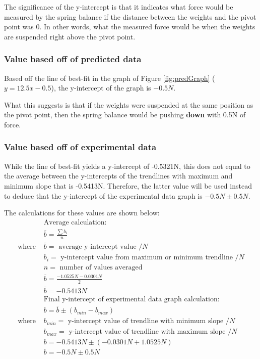 \documentclass[letterpaper, 12pt]{article}
\begin{document}
The significance of the y-intercept is that it indicates what force would
be measured by the spring balance if the distance between the weights and
the pivot point was 0. In other words, what the measured force would be when
the weights are suspended right above the pivot point.

\subsubsection{Value based off of predicted data}

Based off the line of best-fit in the graph of Figure \ref*{fig:predGraph}
($y = 12.5x - 0.5$), the y-intercept of the graph is $-0.5\unit{N}$.

What this suggests is that if the weights were suspended at the same
position as the pivot point, then the spring balance would be pushing
\textbf{down} with 0.5\unit{N} of force.

\subsubsection{Value based off of experimental data}

While the line of best-fit yields a y-intercept of -0.5321\unit{N},
this does not equal to the average between the y-intercepts of the
trendlines with maximum and minimum slope that is -0.5413\unit{N}. Therefore,
the latter value will be used instead to deduce that the y-intercept of
the experimental data graph is $-0.5\unit{N} \pm 0.5\unit{N}$.

The calculations for these values are shown below:
\begin{align*}
                  & \text{Average calculation:}
    \\
                  & \overline{b} = \frac{\sum b_i}{n}
    \\
    \text{where } & \overline{b} = \text{ average y-intercept value } /\unit{N}
    \\ & b_i = \text{ y-intercept value from maximum or minimum trendline } /\unit{N}
    \\ & n = \text{ number of values averaged }
    \\
                  & \overline{b} = \frac{-1.0525\unit{N} - 0.0301\unit{N}}{2}
    \\
                  & \overline{b} = -0.5413\unit{N}
    \\
                  & \text{Final y-intercept of experimental data graph calculation:}
    \\
                  & b = \overline{b} \pm (b_{min} - b_{max})
    \\
    \text{where } & b_{min} = \text{ y-intercept value of trendline with minimum slope } /\unit{N}
    \\ & b_{max} = \text{ y-intercept value of trendline with maximum slope } /\unit{N}
    \\
                  & b = -0.5413\unit{N} \pm (-0.0301\unit{N} + 1.0525\unit{N})
    \\
                  & b = -0.5\unit{N} \pm 0.5\unit{N}
\end{align*}
\end{document}
